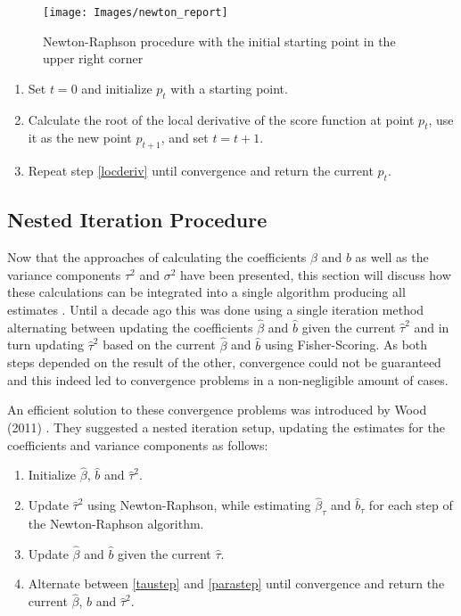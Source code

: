 \documentclass[12pt]{article}
\begin{document}
\begin{figure}[t]
\begin{center}
\texttt{[image: Images/newton\_report]}
\end{center}
\vspace{-2em}
\caption[caption]{Newton-Raphson procedure with the initial starting point in the upper right corner}\label{newton}
\vspace{1em}
\end{figure}

\begin{enumerate}
\item Set $t=0$ and initialize $p_t$ with a starting point.
\item Calculate the root of the local derivative of the score function at point $p_{t}$,  use it as the new point $p_{t+1}$, and set $t=t+1$. \label{locderiv}
\item Repeat step \ref{locderiv} until convergence and return the current $p_t$.
\end{enumerate}



\subsection{Nested Iteration Procedure}\label{nested}

Now that the approaches of calculating the coefficients $\beta$ and $b$ as well as the variance components $\tau^2$ and $\sigma^2$ have been presented, this section will discuss how these calculations can be integrated into a single algorithm producing all estimates \cite{wood2011fast}. Until a decade ago this was done using a single iteration method alternating between updating the coefficients $\hat{\beta}$ and $\hat{b}$ given the current $\hat{\tau}^2$ and in turn updating $\hat{\tau}^2$ based on the current $\hat{\beta}$ and $\hat{b}$ using Fisher-Scoring. As both steps depended on the result of the other, convergence could not be guaranteed and this indeed led to convergence problems in a non-negligible amount of cases.

An efficient solution to these convergence problems was introduced by Wood (2011) \cite{wood2011fast}. They suggested a nested iteration setup, updating the estimates for the coefficients and variance components as follows:



\begin{enumerate}
\item Initialize $\hat{\beta}$, $\hat{b}$ and $\hat{\tau}^2$.
\item Update $\hat{\tau}^2$ using Newton-Raphson, while estimating $\hat{\beta}_{\tau}$ and $\hat{b}_\tau$ for each step of the Newton-Raphson algorithm. \label{taustep}
\item Update $\hat{\beta}$ and $\hat{b}$ given the current $\hat{\tau}$.\label{parastep}
\item Alternate between \ref{taustep} and \ref{parastep} until convergence and return the current $\hat{\beta}$, $\hat{b}$ and $\hat{\tau}^2$.
\end{enumerate}
\end{document}
